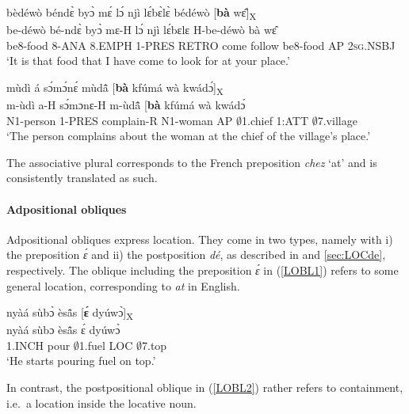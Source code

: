 \begin{exe} 
\ex\label{chez1}
  \glll bèdéwò béndɛ̀ byɔ̀ mɛ́ lɔ́ njì lɛ́bɛ̀lɛ̀ bédéwò [{\bfseries bà} wɛ̂]\textsubscript{X} \\
        be-déwò bé-ndɛ̀ byɔ̀ mɛ-H lɔ́ njì lɛ́bɛlɛ H-be-déwò bà wɛ̂ \\
           be8-food 8-ANA 8.EMPH 1-PRES RETRO come  follow be8-food AP 2\textsc{sg}.NSBJ  \\
    \trans `It is that food that I have come to look for at your place.'
\end{exe}

\begin{exe} 
\ex\label{chez2}
  \glll mùdì á sɔ́mɔ́nɛ́ mùdã̂ [{\bfseries bà} kfúmá wà kwádɔ́]\textsubscript{X} \\
        m-ùdì a-H sɔ́mɔnɛ-H m-ùdã̂ [{\bfseries bà} kfúmá wà kwádɔ́ \\
           N1-person 1-PRES complain-R N1-woman AP $\emptyset$1.chief 1:ATT $\emptyset$7.village  \\
    \trans `The person complains about the woman at the chief of the village's place.'
\end{exe}

\noindent The associative plural corresponds to the French preposition {\itshape chez} `at' and is consistently translated as such.



\paragraph{Adpositional obliques}
Adpositional obliques express location. They come in two types, namely with i) the preposition {\itshape ɛ́} and ii) the postposition {\itshape dé}, as described in  and \ref{sec:LOCde}, respectively. The oblique including the preposition {\itshape ɛ́} in (\ref{LOBL1}) refers to some general location, corresponding to {\itshape at} in English.

\begin{exe} 
\ex\label{LOBL1}
  \glll nyàá sùbɔ̀ èsã̂s [{\bfseries ɛ́} dyúwɔ̀]\textsubscript{X} \\
        nyàá sùbɔ èsã̂s ɛ́ dyúwɔ̀ \\
       1.INCH pour $\emptyset$1.fuel LOC $\emptyset$7.top  \\
    \trans `He starts pouring fuel on top.'
\end{exe}

\noindent In contrast, the postpositional oblique in (\ref{LOBL2}) rather refers to containment, i.e.\ a location inside the locative noun.

